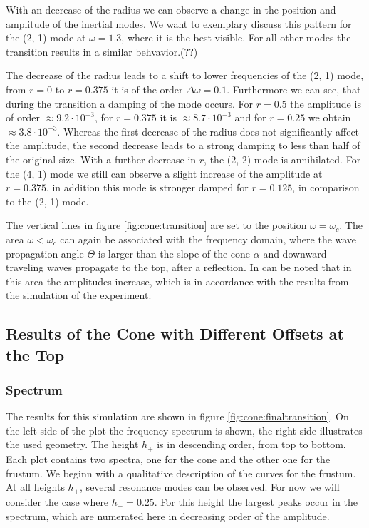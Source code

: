 With an decrease of the radius we can observe a change in the position and amplitude of the
inertial modes. We want to exemplary discuss this pattern for the (2, 1) mode at $\omega=1.3$, where it is the best visible.
For all other modes the transition results in a similar behvavior.(??)

The decrease of the radius leads to a shift to lower frequencies of the (2, 1) mode,
from $r=0$ to $r=0.375$ it is of the order $\Delta \omega=0.1$.
Furthermore we can see, that during the transition a damping of the mode occurs.
For $r=0.5$ the amplitude is of order $\approx9.2\cdot10^{-3}$, for $r=0.375$ it is
$\approx8.7\cdot10^{-3}$ and for $r=0.25$ we obtain $\approx3.8\cdot10^{-3}$.
Whereas the first decrease of the radius does not significantly affect the amplitude,
the second decrease leads to a strong damping to less than half of the original size.
With a further decrease in $r$, the (2, 2) mode is annihilated.
For the (4, 1) mode we still can observe a slight increase of the amplitude at $r=0.375$,
in addition this mode is stronger damped for $r=0.125$, in comparison to the (2, 1)-mode.

The vertical lines in figure \ref{fig:cone:transition} are set to the position $\omega=\omega_c$.
The area $\omega<\omega_c$ can again be associated with the frequency domain, where the wave propagation angle $\Theta$ is larger than
the  slope of the cone $\alpha$ and downward traveling waves propagate to the top, after a reflection.
In can be noted that in this area the amplitudes increase, which is in accordance with the
results from the simulation of the experiment.




\clearpage


\subsection{Results of the Cone with Different Offsets at the Top}
\subsubsection{Spectrum}

The results for this simulation are shown in figure \ref{fig:cone:finaltransition}.
On the left side of the plot  the frequency spectrum is shown, the right side illustrates the used geometry.
The height $h_+$ is in descending order, from top to bottom.
Each plot contains two spectra, one for the cone  and the other one for the frustum.
We beginn with a qualitative description of the curves for the frustum.\\
At all heights $h_+$, several resonance modes can be observed. For now we will consider the case where ${h_+=0.25}$.
For this height the largest peaks occur in the spectrum, which are numerated here in decreasing order of the amplitude.

